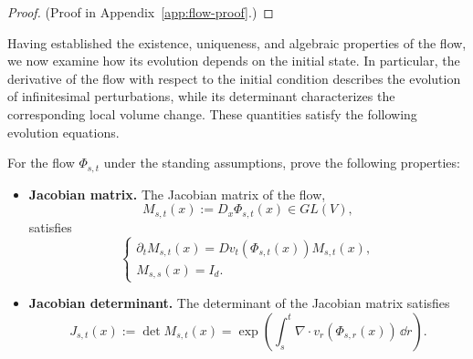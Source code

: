 \documentclass[12pt,a4paper,oneside]{book}
\begin{document}
\begin{proof}
    (Proof in Appendix~\ref{app:flow-proof}.)
\end{proof}

Having established the existence, uniqueness, and algebraic properties of the flow, we now examine how its evolution depends
on the initial state. In particular, the derivative of the flow with respect to the initial condition describes the evolution
of infinitesimal perturbations, while its determinant characterizes the corresponding local volume change. These quantities
satisfy the following evolution equations.

\begin{proposition}
\label{prop:variational}
\label{src:p9q3}\label{src:p9q4}

For the flow $\Phi_{s,t}$ under the standing assumptions, prove the following properties:
\begin{itemize}
    \item \textbf{Jacobian matrix.}
        The Jacobian matrix of the flow,
        \begin{equation*}
            M_{s,t}(x):=D_x\Phi_{s,t}(x)\in GL(V),
        \end{equation*}
        satisfies
        \begin{equation}
            \begin{cases}
                \partial_t M_{s,t}(x) = Dv_t(\Phi_{s,t}(x))M_{s,t}(x),\\
                M_{s,s}(x)=I_d.
            \end{cases}
            \label{eq:variational}
        \end{equation}

    \item \textbf{Jacobian determinant.}
        The determinant of the Jacobian matrix satisfies
        \begin{equation}
            J_{s,t}(x):=\det M_{s,t}(x) =
            \exp\left(
                \int_s^t \nabla\cdot v_r(\Phi_{s,r}(x)) \,\dd r
            \right).
            \label{eq:jacobian-determinant}
        \end{equation}
\end{itemize}
\end{proposition}
\end{document}
